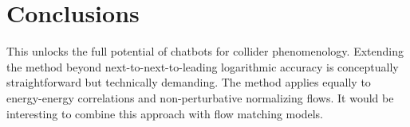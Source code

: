\section{Conclusions}\label{sec:conclusions}

This unlocks the full potential of chatbots for collider phenomenology.
Extending the method beyond next-to-next-to-leading logarithmic accuracy
is conceptually straightforward but technically demanding. The method
applies equally to energy-energy correlations and non-perturbative
normalizing flows. It would be interesting to combine this approach with
flow matching models.

